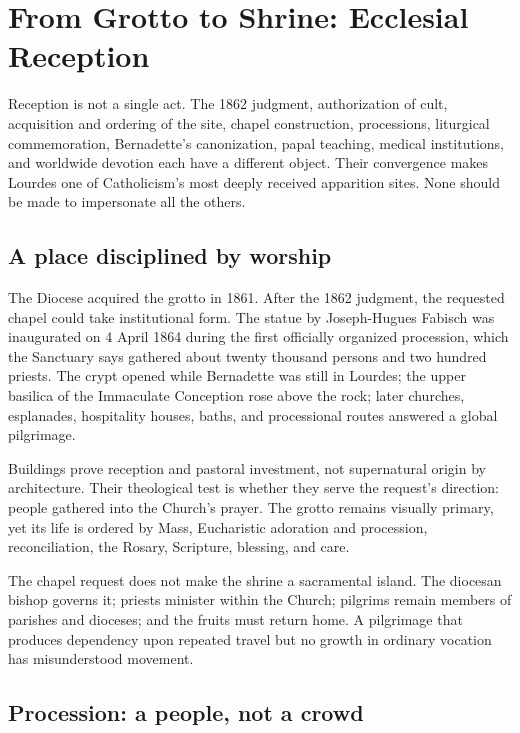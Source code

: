 \section{From Grotto to Shrine: Ecclesial Reception}

Reception is not a single act. The 1862 judgment, authorization of cult, acquisition and ordering of the site, chapel construction, processions, liturgical commemoration, Bernadette's canonization, papal teaching, medical institutions, and worldwide devotion each have a different object. Their convergence makes Lourdes one of Catholicism's most deeply received apparition sites. None should be made to impersonate all the others.

\subsection{A place disciplined by worship}

The Diocese acquired the grotto in 1861. After the 1862 judgment, the requested chapel could take institutional form. The statue by Joseph-Hugues Fabisch was inaugurated on 4 April 1864 during the first officially organized procession, which the Sanctuary says gathered about twenty thousand persons and two hundred priests. The crypt opened while Bernadette was still in Lourdes; the upper basilica of the Immaculate Conception rose above the rock; later churches, esplanades, hospitality houses, baths, and processional routes answered a global pilgrimage.

Buildings prove reception and pastoral investment, not supernatural origin by architecture. Their theological test is whether they serve the request's direction: people gathered into the Church's prayer. The grotto remains visually primary, yet its life is ordered by Mass, Eucharistic adoration and procession, reconciliation, the Rosary, Scripture, blessing, and care.

The chapel request does not make the shrine a sacramental island. The diocesan bishop governs it; priests minister within the Church; pilgrims remain members of parishes and dioceses; and the fruits must return home. A pilgrimage that produces dependency upon repeated travel but no growth in ordinary vocation has misunderstood movement.

\subsection{Procession: a people, not a crowd}

